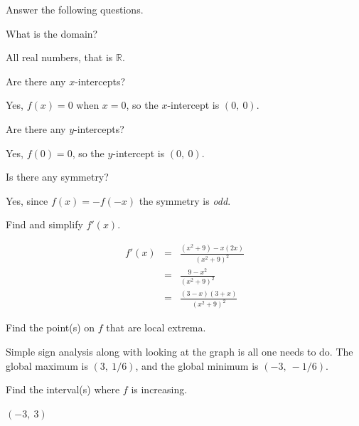 \documentclass[12pt,addpoints, answers, fleqn]{exam}
\begin{document}
Answer the following questions.
\begin{questions}

\question What is the domain?

\begin{solution}
All real numbers, that is $\mathbb{R}$.
\end{solution}


\question Are there any $x$-intercepts?

\begin{solution}
Yes, $f\left(x\right) = 0$ when $x=0$, so the $x$-intercept is $\left( 0, \ 0 \right)$.
\end{solution}

\question Are there any $y$-intercepts?

\begin{solution}
Yes, $f\left(0\right) = 0$, so the $y$-intercept is $\left( 0, \ 0 \right)$.
\end{solution}

\question Is there any symmetry?

\begin{solution}
Yes, since $f\left(x\right) = -f\left(-x\right)$ the symmetry is \emph{odd}.
\end{solution}

\question Find and simplify $f'\left( x \right)$.

\begin{solution}
\begin{eqnarray*}
f' \left( x \right) &=& \frac{\left(x^2+9\right) - x \left(2x\right)}{\left(x^2+9\right)^2}\\
&=& \frac{9 - x^2}{\left(x^2+9\right)^2}\\
&=& \frac{\left(3-x \right) \left(3+x \right)}{\left(x^2+9\right)^2}
\end{eqnarray*}
\end{solution}

\question Find the point(s) on $f$ that are local extrema.

\begin{solution}
Simple sign analysis along with looking at the graph is all one needs to do. The global maximum is $\left( 3, \ 1/6 \right)$, and the global minimum is $\left( -3, \ -1/6 \right)$.
\end{solution}

\question Find the interval(s) where $f$ is increasing.

\begin{solution}
$\left(-3, \ 3\right)$
\end{solution}


\end{questions}
\end{document}

